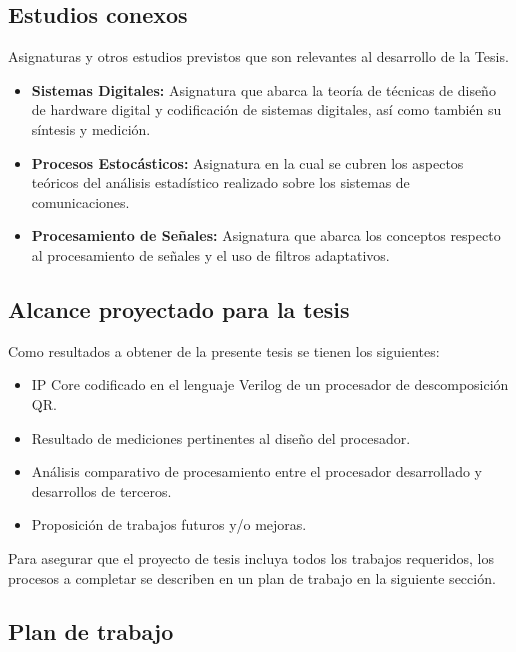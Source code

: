 \documentclass[a4paper]{article}
\begin{document}
\subsection{Estudios conexos}

Asignaturas y otros estudios previstos que son relevantes al desarrollo de la Tesis.

\begin{itemize}
   \item \textbf{Sistemas Digitales:} Asignatura que abarca la teoría de técnicas de diseño de hardware digital y codificación de sistemas digitales, así como también su síntesis y medición.
   \item \textbf{Procesos Estocásticos:} Asignatura en la cual se cubren los aspectos teóricos del análisis estadístico realizado sobre los sistemas de comunicaciones.
   \item \textbf{Procesamiento de Señales:} Asignatura que abarca los conceptos respecto al procesamiento de señales y el uso de filtros adaptativos.
\end{itemize}

\subsection{Alcance proyectado para la tesis}

Como resultados a obtener de la presente tesis se tienen los siguientes:

\begin{itemize}
    \item IP Core codificado en el lenguaje Verilog de un procesador de descomposición QR.
    \item Resultado de mediciones pertinentes al diseño del procesador.
    \item Análisis comparativo de procesamiento entre el procesador desarrollado y desarrollos de terceros.
    \item Proposición de trabajos futuros y/o mejoras.
\end{itemize}

Para asegurar que el proyecto de tesis incluya todos los trabajos requeridos, los procesos a completar se describen en un plan de trabajo en la siguiente sección.

\newpage

\subsection{Plan de trabajo}
\end{document}
